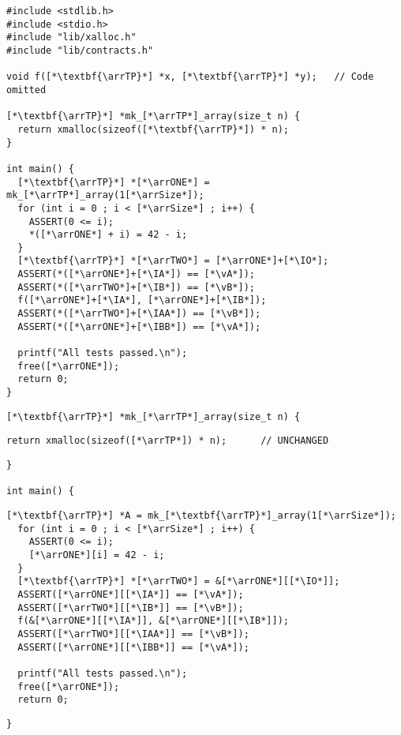 \bigskip
\begin{lstlisting}
#include <stdlib.h>
#include <stdio.h>
#include "lib/xalloc.h"
#include "lib/contracts.h"

void f([*\textbf{\arrTP}*] *x, [*\textbf{\arrTP}*] *y);   // Code omitted

[*\textbf{\arrTP}*] *mk_[*\arrTP*]_array(size_t n) {
  return xmalloc(sizeof([*\textbf{\arrTP}*]) * n);
}

int main() {
  [*\textbf{\arrTP}*] *[*\arrONE*] = mk_[*\arrTP*]_array(1[*\arrSize*]);
  for (int i = 0 ; i < [*\arrSize*] ; i++) {
    ASSERT(0 <= i);
    *([*\arrONE*] + i) = 42 - i;
  }
  [*\textbf{\arrTP}*] *[*\arrTWO*] = [*\arrONE*]+[*\IO*];
  ASSERT(*([*\arrONE*]+[*\IA*]) == [*\vA*]);
  ASSERT(*([*\arrTWO*]+[*\IB*]) == [*\vB*]);
  f([*\arrONE*]+[*\IA*], [*\arrONE*]+[*\IB*]);
  ASSERT(*([*\arrTWO*]+[*\IAA*]) == [*\vB*]);
  ASSERT(*([*\arrONE*]+[*\IBB*]) == [*\vA*]);

  printf("All tests passed.\n");
  free([*\arrONE*]);
  return 0;
}
\end{lstlisting}
\newpage
\begin{framed}
\begin{lstlisting}[belowskip=0pt]
[*\textbf{\arrTP}*] *mk_[*\arrTP*]_array(size_t n) {
\end{lstlisting}
\ifprintanswers
\begin{lstlisting}[basicstyle=\basicstyle\color{\answerColor}]
  return xmalloc(sizeof([*\arrTP*]) * n);      // UNCHANGED
\end{lstlisting}
\else\vspace{0.5in}\fi
\begin{lstlisting}[aboveskip=0pt, belowskip=0pt]
}

int main() {
\end{lstlisting}
\ifprintanswers
\begin{lstlisting}[basicstyle=\basicstyle\color{\answerColor}]
  [*\textbf{\arrTP}*] *A = mk_[*\textbf{\arrTP}*]_array(1[*\arrSize*]);
  for (int i = 0 ; i < [*\arrSize*] ; i++) {
    ASSERT(0 <= i);
    [*\arrONE*][i] = 42 - i;
  }
  [*\textbf{\arrTP}*] *[*\arrTWO*] = &[*\arrONE*][[*\IO*]];
  ASSERT([*\arrONE*][[*\IA*]] == [*\vA*]);
  ASSERT([*\arrTWO*][[*\IB*]] == [*\vB*]);
  f(&[*\arrONE*][[*\IA*]], &[*\arrONE*][[*\IB*]]);
  ASSERT([*\arrTWO*][[*\IAA*]] == [*\vB*]);
  ASSERT([*\arrONE*][[*\IBB*]] == [*\vA*]);

  printf("All tests passed.\n");
  free([*\arrONE*]);
  return 0;
\end{lstlisting}
\else\vspace{10cm}\fi
\begin{lstlisting}[aboveskip=0pt]
}
\end{lstlisting}
\end{framed}


